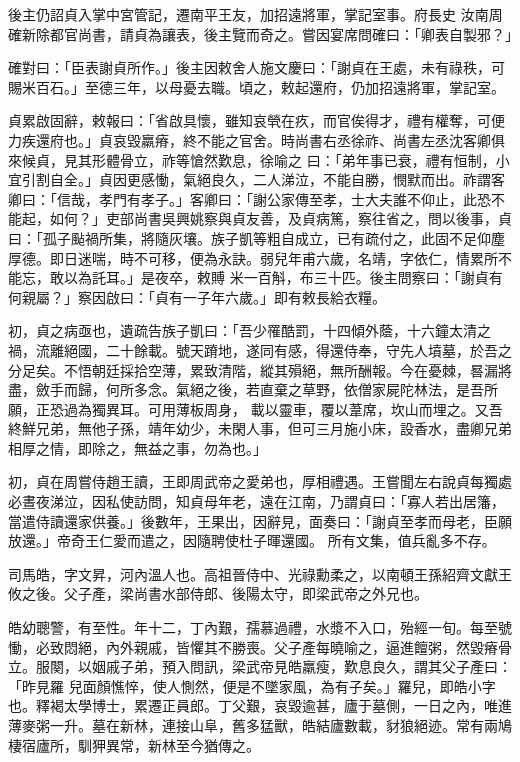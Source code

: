 \begin{pinyinscope}
 後主仍詔貞入掌中宮管記，遷南平王友，加招遠將軍，掌記室事。府長史
 汝南周確新除都官尚書，請貞為讓表，後主覽而奇之。嘗因宴席問確曰：「卿表自製邪？」



 確對曰：「臣表謝貞所作。」後主因敕舍人施文慶曰：「謝貞在王處，未有祿秩，可賜米百石。」至德三年，以母憂去職。頃之，敕起還府，仍加招遠將軍，掌記室。



 貞累啟固辭，敕報曰：「省啟具懷，雖知哀煢在疚，而官俟得才，禮有權奪，可便力疾還府也。」貞哀毀羸瘠，終不能之官舍。時尚書右丞徐祚、尚書左丞沈客卿俱來候貞，見其形體骨立，祚等愴然歎息，徐喻之
 曰：「弟年事已衰，禮有恒制，小宜引割自全。」貞因更感慟，氣絕良久，二人涕泣，不能自勝，憫默而出。祚謂客卿曰：「信哉，孝門有孝子。」客卿曰：「謝公家傳至孝，士大夫誰不仰止，此恐不能起，如何？」吏部尚書吳興姚察與貞友善，及貞病篤，察往省之，問以後事，貞曰：「孤子颭禍所集，將隨灰壤。族子凱等粗自成立，已有疏付之，此固不足仰塵厚德。即日迷喘，時不可移，便為永訣。弱兒年甫六歲，名靖，字依仁，情累所不能忘，敢以為託耳。」是夜卒，敕賻
 米一百斛，布三十匹。後主問察曰：「謝貞有何親屬？」察因啟曰：「貞有一子年六歲。」即有敕長給衣糧。



 初，貞之病亟也，遺疏告族子凱曰：「吾少罹酷罰，十四傾外蔭，十六鐘太清之禍，流離絕國，二十餘載。號天蹐地，遂同有感，得還侍奉，守先人墳墓，於吾之分足矣。不悟朝廷採拾空薄，累致清階，縱其殞絕，無所酬報。今在憂棘，晷漏將盡，斂手而歸，何所多念。氣絕之後，若直棄之草野，依僧家屍陀林法，是吾所願，正恐過為獨異耳。可用薄板周身，
 載以靈車，覆以葦席，坎山而埋之。又吾終鮮兄弟，無他子孫，靖年幼少，未閑人事，但可三月施小床，設香水，盡卿兄弟相厚之情，即除之，無益之事，勿為也。」



 初，貞在周嘗侍趙王讀，王即周武帝之愛弟也，厚相禮遇。王嘗聞左右說貞每獨處必晝夜涕泣，因私使訪問，知貞母年老，遠在江南，乃謂貞曰：「寡人若出居籓，當遣侍讀還家供養。」後數年，王果出，因辭見，面奏曰：「謝貞至孝而母老，臣願放還。」帝奇王仁愛而遣之，因隨聘使杜子暉還國。
 所有文集，值兵亂多不存。



 司馬皓，字文昇，河內溫人也。高祖晉侍中、光祿勳柔之，以南頓王孫紹齊文獻王攸之後。父子產，梁尚書水部侍郎、後陽太守，即梁武帝之外兄也。



 皓幼聰警，有至性。年十二，丁內艱，孺慕過禮，水漿不入口，殆經一旬。每至號慟，必致悶絕，內外親戚，皆懼其不勝喪。父子產每曉喻之，逼進饘粥，然毀瘠骨立。服闋，以姻戚子弟，預入問訊，梁武帝見皓羸瘦，歎息良久，謂其父子產曰：「昨見羅
 兒面顏憔悴，使人惻然，便是不墜家風，為有子矣。」羅兒，即皓小字也。釋褐太學博士，累遷正員郎。丁父艱，哀毀逾甚，廬于墓側，一日之內，唯進薄麥粥一升。墓在新林，連接山阜，舊多猛獸，皓結廬數載，豺狼絕迹。常有兩鳩棲宿廬所，馴狎異常，新林至今猶傳之。




\end{pinyinscope}
